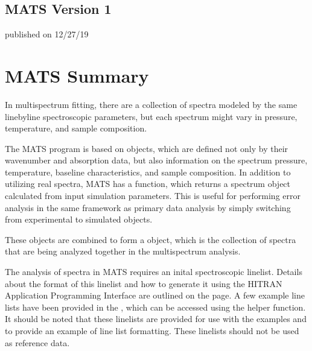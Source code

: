 \documentclass[letterpaper,10pt,english]{sphinxmanual}
\begin{document}
\subsection{MATS Version 1}
\label{\detokenize{MATS Version Summary:mats-version-1}}
\sphinxAtStartPar
published on 12/27/19

\sphinxstepscope


\section{MATS Summary}
\label{\detokenize{MATS Summary:mats-summary}}\label{\detokenize{MATS Summary::doc}}
\sphinxAtStartPar
In multi\sphinxhyphen{}spectrum fitting, there are a collection of spectra modeled by the same line\sphinxhyphen{}by\sphinxhyphen{}line spectroscopic parameters, but each spectrum might vary in pressure, temperature, and sample composition.

\sphinxAtStartPar
The MATS program is based on {\hyperref[\detokenize{MATS:MATS.spectrum.Spectrum}]{}} objects, which are defined not only by their wavenumber and absorption data, but also information on the spectrum pressure, temperature, baseline characteristics, and sample composition.  In addition to utilizing real spectra, MATS has a {\hyperref[\detokenize{MATS:MATS.spectrum.simulate_spectrum}]{}} function, which returns a spectrum object calculated from input simulation parameters.  This is useful for performing error analysis in the same framework as primary data analysis by simply switching from experimental to simulated {\hyperref[\detokenize{MATS:MATS.spectrum.Spectrum}]{}} objects.

\sphinxAtStartPar
These objects are combined to form a {\hyperref[\detokenize{MATS:MATS.dataset.Dataset}]{}} object, which is the collection of spectra that are being analyzed together in the multi\sphinxhyphen{}spectrum analysis.

\sphinxAtStartPar
The analysis of spectra in MATS requires an inital spectroscopic linelist.  Details about the format of this linelist and how to generate it using the HITRAN Application Programming Interface are outlined on the  {\hyperref[\detokenize{Generating Parameter Line lists::doc}]{}} page.  A few example line lists have been provided in the  , which can be accessed using the {\hyperref[\detokenize{MATS:MATS.linelistdata.LoadLineListData}]{}} helper function.  It should be noted that these linelists are provided for use with the examples and to provide an example of line list formatting.  These linelists should not be used as reference data.
\end{document}
